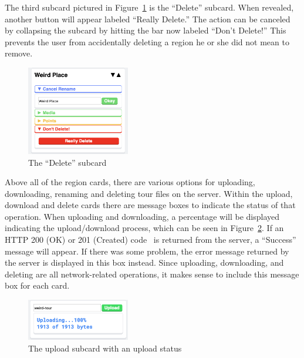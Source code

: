 \documentclass[a4paper, 10pt, american, titlepage]{article}
\begin{document}
The third subcard pictured in Figure~\ref{fig:deleteSubcard} is the ``Delete''
subcard. When revealed, another button will appear labeled ``Really Delete.''
The action can be canceled by collapsing the subcard by hitting the bar now
labeled ``Don't Delete!'' This prevents the user from accidentally deleting a
region he or she did not mean to remove.

\begin{figure}[h]
	\centering
    \includegraphics[width=0.4\textwidth]{delete-subcard-editour.png}
    \caption{The ``Delete'' subcard}
	\label{fig:deleteSubcard}
\end{figure}

Above all of the region cards, there are various options for uploading,
downloading, renaming and deleting tour files on the server. Within the upload,
download and delete cards there are message boxes to indicate the status of
that operation. When uploading and downloading, a percentage will be displayed
indicating the upload/download process, which can be seen in
Figure~\ref{fig:uploadingMessage}. If an HTTP 200 (OK) or 201 (Created)
code~\autocite{rfc7231} is returned from the server, a ``Success'' message will
appear. If there was some problem, the error message returned by the server is
displayed in this box instead. Since uploading, downloading, and deleting are
all network-related operations, it makes sense to include this message box for
each card.

\begin{figure}[h]
	\centering
    \includegraphics[width=0.4\textwidth]{uploading-message-editour.png}
    \caption{The upload subcard with an upload status}
	\label{fig:uploadingMessage}
\end{figure}
\end{document}
